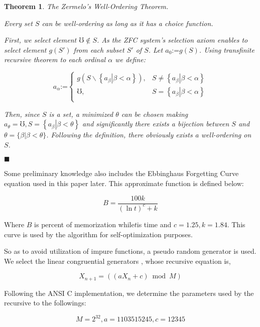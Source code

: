 \documentclass{article}
\newtheorem{theorem}{Theorem}
\begin{document}
\begin{theorem}
	The Zermelo{'}s Well-Ordering Theorem.\cite{1}
	
	Every set \(S\) can be well-ordering as long as it has a choice function.
	
	 First, we select element \(\mho \notin S\). As the ZFC system{'}s selection axiom enables to select element \(g(S')\) from each subset \(S'\) of \(S\). Let \(a_0\text{:=}g(S)\). Using transfinite recursive theorem to each ordinal \(\alpha\) we define:
	
	\[a_{\alpha }\text{:=}\left\{
	\begin{array}{cc}
		g\left(S\backslash \left\{\left.a_{\beta }\right|\beta <\alpha \right\}\right), & S\neq \left\{\left.a_{\beta }\right|\beta <\alpha \right\} \\
		\mho , & S=\left\{\left.a_{\beta }\right|\beta <\alpha \right\} \\
	\end{array}
	\right.\]
	
	Then, since \(S\) is a set, a minimized \(\theta\) can be chosen making \(a_{\theta }=\mho , S=\left\{\left.a_{\beta }\right|\beta <\theta \right\}\) and significantly there exists a bijection between \(S\) and \(\theta =\{\beta |\beta <\theta \}\). Following the definition, there obviously exists a well-ordering on \(S\).
	\begin{flushright}
		$\blacksquare $
	\end{flushright}
\end{theorem}

Some preliminary knowledge also includes the Ebbinghaus Forgetting Curve equation \cite{4} used in this paper later. This approximate function is defined below:

\[B=\frac{100 k}{(\ln  t)^c+k}\]

Where \(B\) is percent of memorization while\(t\)is time and \(c=1.25,k=1.84\). This curve is used by the algorithm for self-optimization purposes.

So as to avoid utilization of impure functions, a pseudo random generator is used. We select the linear congruential generators \cite{5}, whose recursive equation is,

\[X_{n+1}=(\left(a X_n+c\right) \bmod M)\]

Following the ANSI C implementation, we determine the parameters used by the recursive to the followings:

\[M=2^{32},a=1103515245, c=12345\]
\end{document}
